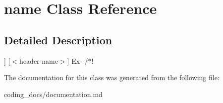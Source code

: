 \hypertarget{classname}{}\section{name Class Reference}
\label{classname}


\subsection{Detailed Description}
\mbox{]} \mbox{[}$<$header-\/name$>$\mbox{]} Ex-\/ /$\ast$! 

The documentation for this class was generated from the following file\+:\begin{DoxyCompactItemize}
\item 
coding\+\_\+docs/documentation.\+md\end{DoxyCompactItemize}
